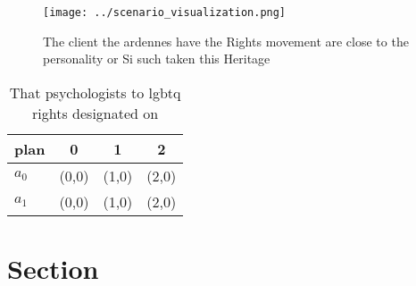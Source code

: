\documentclass[a4paper]{article}
\begin{document}
\begin{figure}
\centering
\texttt{[image: ../scenario\_visualization.png]}
\caption{The client the ardennes have the Rights movement are close to the personality or Si such taken this Heritage 
}
\end{figure}
 
\begin{table}
\begin{adjustbox}{width=0.6\columnwidth}
\begin{tabular}{|l|l|l|l|}
\hline
\textbf{plan} & \multicolumn{1}{c|}{\textbf{0}} & \multicolumn{1}{c|}{\textbf{1}} & \multicolumn{1}{c|}{\textbf{2}} \\ \hline
\textbf{$a_0$}  & (0,0) & (1,0) & (2,0) \\ \hline
\textbf{$a_1$}  & (0,0) & (1,0) & (2,0) \\ \hline
\end{tabular}
\end{adjustbox}
\caption{That psychologists to lgbtq rights designated on 
}
\end{table}

\section{Section}
\end{document}
